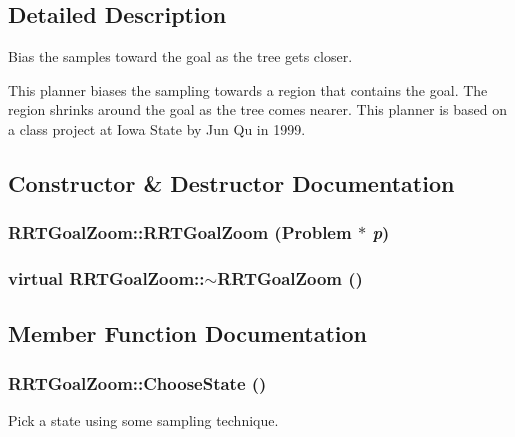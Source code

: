 \subsection{Detailed Description}
Bias the samples toward the goal as the tree gets closer.

This planner biases the sampling towards a region that contains  the goal. The region shrinks around the goal as the tree comes nearer.  This planner is based on a class project at Iowa State by Jun Qu in 1999. 



\subsection{Constructor \& Destructor Documentation}
\subsubsection{\setlength{\rightskip}{0pt plus 5cm}RRTGoal\-Zoom::RRTGoal\-Zoom ({\bf Problem} $\ast$ {\em p})}\label{classRRTGoalZoom_a0}


\subsubsection{\setlength{\rightskip}{0pt plus 5cm}virtual RRTGoal\-Zoom::$\sim$RRTGoal\-Zoom ()\hspace{0.3cm}{\tt  [inline, virtual]}}\label{classRRTGoalZoom_a1}




\subsection{Member Function Documentation}
\subsubsection{ RRTGoal\-Zoom::Choose\-State ()\hspace{0.3cm}{\tt  [protected, virtual]}}\label{classRRTGoalZoom_b0}


Pick a state using some sampling technique.



